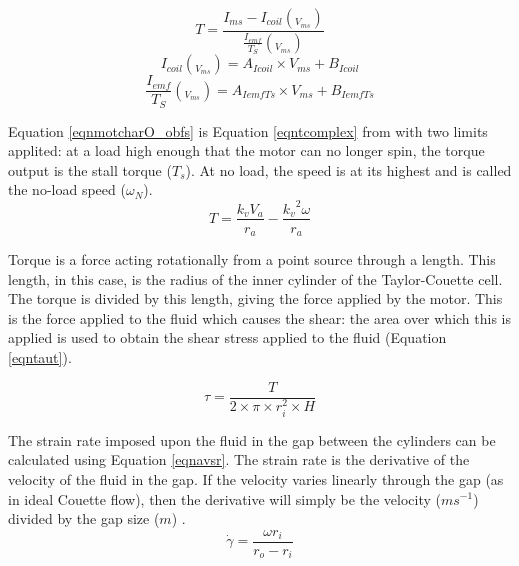 \documentclass[twoside,a4]{report}
\begin{document}
	\begin{equation}
		T = \frac{I_{ms} - I_{coil} (_{V_{ms}})}{\frac{I_{emf}}{T_S} (_{V_{ms}})}
		\label{eqntorqueget}
	\end{equation}
	\begin{equation}
		I_{coil} (_{V_{ms}}) = A_{Icoil} \times V_{ms} + B_{Icoil}
		\label{eqnicocalea}
	\end{equation}
	\begin{equation}
		\frac{I_{emf}}{T_S} (_{V_{ms}}) = A_{IemfTs} \times V_{ms} + B_{IemfTs}
		\label{eqnemftscalea}
	\end{equation}

	\noindent
	Equation \ref{eqnmotcharO_obfs} is Equation \ref{eqntcomplex} from \cite{backdcmotor} with two limits applited: at a load high enough that the motor can no longer spin, the torque output is the stall torque (\(T_s\)). At no load, the speed is at its highest and is called the no-load speed (\(\omega_N\)).
	\begin{equation}
	T = \frac{k_v V_a}{r_a} - \frac{{{k_v}^2} \omega}{r_a}
	\label{eqntcomplex}
	\end{equation}
	
	
	Torque is a force acting rotationally from a point source through a length. This length, in this case, is the radius of the inner cylinder of the Taylor-Couette cell. The torque is divided by this length, giving the force applied by the motor. This is the force applied to the fluid which causes the shear: the area over which this is applied is used to obtain the shear stress applied to the fluid (Equation \ref{eqntaut}).
	
	\begin{equation}
	\tau = \frac{T}{2 \times \pi \times r_i^2 \times H}
	\label{eqntaut}
	\end{equation}
	
	
	\noindent
	The strain rate imposed upon the fluid in the gap between the cylinders can be calculated using Equation \ref{eqnavsr}. The strain rate is the derivative of the velocity of the fluid in the gap. If the velocity varies linearly through the gap (as in ideal Couette flow), then the derivative will simply be the velocity ($ms^{-1}$) divided by the gap size ($m$) \cite{couetteshearcell}.
	\begin{equation}
	\dot{\gamma} = \frac{\omega r_i}{r_o - r_i}
	\label{eqnavsr}
	\end{equation}
	
\end{document}
